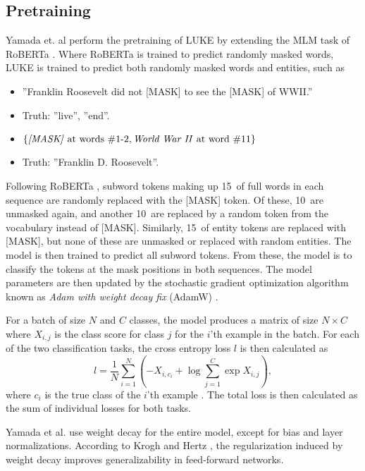 \documentclass[main.tex]{subfiles}
\begin{document}
\subsection{Pretraining}
\label{subsec:lukepre}
Yamada et. al perform the pretraining of LUKE by extending the MLM task of RoBERTa \cite{liu2019roberta}.
Where RoBERTa is trained to predict randomly masked words, LUKE is trained to predict both randomly masked words and entities, such as
\begin{itemize}
    \item ''Franklin Roosevelt did not [MASK] to see the [MASK] of WWII.''
    \item[] Truth: ''live'', ''end''.
    \item $\{\text{\emph{[MASK]} at words \#1-2}, \text{\emph{World War II} at word \#11}\}$
    \item[] Truth: ''Franklin D. Roosevelt''.
\end{itemize}
Following RoBERTa \cite{liu2019roberta}, subword tokens making up 15\pro\ of full words in each sequence are randomly replaced with the [MASK] token.
Of these, 10\pro\ are unmasked again, and another 10\pro\ are replaced by a random token from the vocabulary instead of [MASK].
Similarly, 15\pro\ of entity tokens are replaced with [MASK], but none of these are unmasked or replaced with random entities.
The model is then trained to predict all subword tokens.
From these, the model is to classify the tokens at the mask positions in both sequences.
The model parameters are then updated by the stochastic gradient optimization algorithm known as \emph{Adam with weight decay fix} (AdamW) \cite{hutter2019adamw}.

For a batch of size $ N $ and $ C $ classes, the model produces a matrix of size $ N\times C $ where $ X_{i, j} $ is the class score for class $ j $ for the $ i $'th example in the batch.
For each of the two classification tasks, the cross entropy loss $ l $ is then calculated as
\begin{equation}\label{eq:crossentropyloss}
    l = \frac{1}{N} \sum_{i=1}^N \left(
        -X_{i, c_i} + \log \sum_{j=1}^C \exp X_{i, j}
    \right),
\end{equation}
where $ c_i $ is the true class of the $ i $'th example \cite{pytorchcel}.
The total loss is then calculated as the sum of individual losses for both tasks.

Yamada et al. \cite{yamada2020luke} use weight decay for the entire model, except for bias and layer normalizations.
According to Krogh and Hertz \cite{krogh1991weight}, the regularization induced by weight decay improves generalizability in feed-forward networks.
\end{document}
